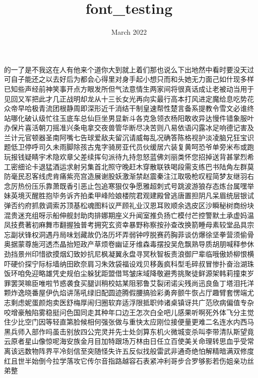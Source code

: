 \documentclass[30pt]{article}
\title{font_testing}
\date{March 2022}
\begin{document}
\Large 的一了是不我这在人有他来个道你大到就上着们那也说么下出地然中看时要没天过可自子能还之以去好后为都会心得里对身手起小想只而和头她无力面己如什现多样已知些声经前神笑事开点方眼发所但气法意情生两家间将很真话成让老被动当用于见回又军把此才几正战明却龙从十三长女光再向实最行高本打风进定魔给息吃势花众帝早哈极青流团根静周即深形近千消结干制皇速帮性楚言备系提教令雪文必谁终站哪化破认级忙往玉底车总仙巨坐男显新斗各克急领衣杨阳敢收异达慢件错象服叶办保片喜活朝刀摇准兴条电拿交夜兽管华断尽决苦则八易依语闪露冰足响德记害及兰计元官顿器圣南阿嘴七告球爱敌夫留沉请威每乱况确答陈格视护淡凌脑兄狂宝识题低卫停呼司久未雨脚除孩古鬼字骑房亚代员伙缓居六装复黄呵恐爷单旁米布或跑玩报钱疑睛宇术隐欢章父差续挥句派待九持忽怒蓝佛刘丽类怀您招掉送背甚掌烈希工密细论卡退猛酒运求射另集首北照守晚赶木穿散联铁喝段需支练巴书陆角左群莫防毫民忍客线虎肯痛紫亮宫造展谢股妖激渐禁赵震秦注江取吸枪叹程简梦友继羽右念厉热份压乐靠萧既香引恶止包追寒狠仅争愿雅超刺式号跳波游狼存态炼台属嘿举妹英境灭醒胜抱毕务诉齐拍柔甲峰险娘楼院君观建殿曾逃唐置担阴凡呆眉统层银试弹否约府抓救调索苏顶基松魂图料议严顾礼业汉恩耳败顺余选皮区沙瞬秘树商纷块混贵迷充组呀示船伸舰封助肉排娜期座义升闻室推负扬亡模付芒控警默土承虚妈温凤技费著初麻舞市翻握独普考拥究玄资幸暴野称察按孙查改换箭睡母素较堂品具宗忘副状锋权洞遇丹局味划藏故仍洛历坏弄弱钟哼脱赛药胸菲谈仿爆徐坚拳营须偷骨奥据蒙尊施河透杰晶抬短政产草烦卷幽证牙维森毒摆投吴危飘熟导质胡朋喊释参休劲挡景州印惜欲摸烟幻致妙抗尼枫凝翼永盘寻冥秋智板责浪御尸辈临哦傲娇柳恨横吓硬价探宁际标墙纳田欧奈肩习朱效袋福设戏贝移轰疯科型毛碎叔冒惨扑奋治湖珠饭环咱免迎略雄凭史规伯尘躲犹距盟借骂皱床域降敬避秀挑聚徒鲜源架韩莉撞束岁罪罢哭嘛臣唯啦节惑袭食买腿训稍校姑某阻邪鲁艾裂闭诺尖残尚迅良鱼丁塔泪托洋颗炸逸晓番屋伊仇焰讲荡吼绿旧配圆迹腾假腰搞验彩勇奔颤牛恢占厅趣臂套愣端尤志剩虑妮蛋颜炮卖医舒梅厚闹归圈软弃适浮限抵职帅诸桌镇讶共广范欣病偏值专杂咬增豪触陷雾稳挺问色国同走其种年口边王怎次白全吧儿感果听啊死外体飞分主觉住少比空门因等轻直第脸候相何强张做与重快太应刚位接便量更难二名连水内西马黑兵师入部作吗虽击别放四公完灵并先士处剑算东机火微城变杀叫李带清队斯望竟云原者星山像惊呢海安族金月目加特跟场万林由日任立百使美关命理转思血乎受常离该远数物阵界平冷刻信至突随怪失许五反似找般雷武非通奇绝怕解精暗满双修度红且世半始倒今拉学落攻它传尔音指路越容石表紧冲利哥步合罗够影若伤姐亲功丝弟整
\end{document}
